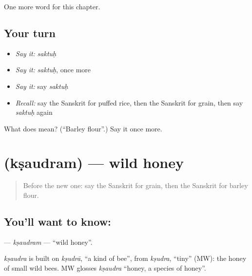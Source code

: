 \begin{grammarlens}[title={What you've built}]
One more word for this chapter.
\end{grammarlens}

\subsection*{Your turn}
\begin{itemize}
\raggedright
  \item \emph{Say it:} \emph{saktuḥ}
  \item \emph{Say it:} \emph{saktuḥ}, once more
  \item \emph{Say it:} say \emph{saktuḥ}
  \item \emph{Recall:} say the Sanskrit for puffed rice, then the Sanskrit for grain, then say \emph{saktuḥ} again
\end{itemize}

\begin{tcolorbox}[breakable,colback=teal!4,colframe=teal!35!black,title={Before you move on}]
What does  mean? (\textquotedblleft{}Barley flour\textquotedblright{}.) Say it once more.
\end{tcolorbox}
\section[\texorpdfstring{\sk{क्षौद्रम्} (kṣaudram)}{क्षौद्रम् (kṣaudram)}]{ (kṣaudram) — wild honey}

\label{lesson:SA-C246-ksaudram}



\begin{quote}
Before the new one: say the Sanskrit for grain, then the Sanskrit for barley flour.
\end{quote}

\subsection*{You'll want to know: }
\textbf{} — \emph{kṣaudram} — \textquotedblleft{}wild honey\textquotedblright{}.

\begin{cousinweb}
\emph{kṣaudra} is built on \emph{kṣudrā}, \textquotedblleft{}a kind of bee\textquotedblright{}, from \emph{kṣudra}, \textquotedblleft{}tiny\textquotedblright{} (MW): the honey of small wild bees. MW glosses \emph{kṣaudra} \textquotedblleft{}honey, a species of honey\textquotedblright{}.
\end{cousinweb}

